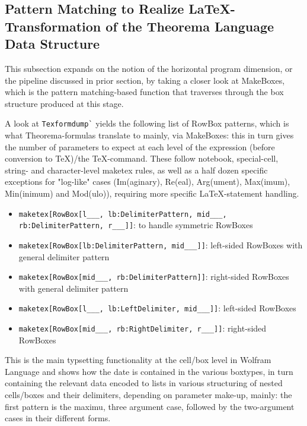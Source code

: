 \subsection{Pattern Matching to Realize \LaTeX-Transformation of the Theorema Language Data Structure}

This subsection expands on the notion of the horizontal program dimension, or the pipeline discussed in prior section, by taking a closer look at MakeBoxes, which is the pattern matching-based function that traverses through the box structure produced at this stage.

A look at \lstinline+Texformdump`+ yields the following list of RowBox patterns, which is what Theorema-formulas translate to mainly, via MakeBoxes: this in turn gives the number of parameters to expect at each level of the expression (before conversion to TeX)/the TeX-command. These follow notebook, special-cell, string- and character-level maketex rules, as well as a half dozen specific exceptions for "log-like" cases (Im(aginary), Re(eal), Arg(ument), Max(imum), Min(inimum) and Mod(ulo)), requiring more specific \LaTeX-statement handling.

\begin{itemize}
    \item \texttt{maketex[RowBox[{l___, lb:DelimiterPattern, mid___, rb:DelimiterPattern, r___}]]}: to handle symmetric RowBoxes
    \item \texttt{maketex[RowBox[{lb:DelimiterPattern, mid___}]]}: left-sided RowBoxes with general delimiter pattern
    \item \texttt{maketex[RowBox[{mid___, rb:DelimiterPattern}]]}: right-sided RowBoxes with general delimiter pattern
    \item \texttt{maketex[RowBox[{l___, lb:LeftDelimiter, mid___}]]}: left-sided RowBoxes 
    \item \texttt{maketex[RowBox[{mid___, rb:RightDelimiter, r___}]]}: right-sided RowBoxes
\end{itemize}

This is the main typsetting functionality at the cell/box level in Wolfram Language and shows how the date is contained in the various boxtypes, in turn containing the relevant data encoded to lists in various structuring of nested cells/boxes and their delimiters, depending on parameter make-up, mainly: the first pattern is the maximu, three argument case, followed by the two-argument cases in their different forms.

